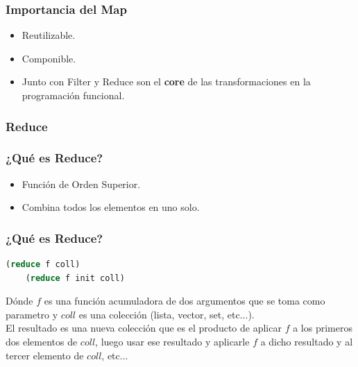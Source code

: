 \documentclass{beamer}
\begin{document}

\begin{frame}[fragile]
    \frametitle{Importancia del Map}
    \begin{itemize}
        \item Reutilizable.
        \item Componible.
        \item Junto con Filter y Reduce son el \textbf{core} de las transformaciones
        en la programación funcional.
    \end{itemize}
\end{frame}

\subsubsection{Reduce}
\begin{frame}[fragile]
    \frametitle{¿Qué es Reduce?}
    \begin{itemize}
        \item Función de Orden Superior.
        \item Combina todos los elementos en uno solo.
    \end{itemize}
\end{frame}


\begin{frame}[fragile]
    \frametitle{¿Qué es Reduce?}
    \begin{center}
    \begin{lstlisting}[language=Clojure]
    (reduce f coll)  
    (reduce f init coll)  
    \end{lstlisting}
    \end{center}
    Dónde $f$ es una función acumuladora de dos argumentos que se toma como parametro y $coll$ es una colección (lista, vector, set, etc...).\\
    El resultado es una nueva colección que es el producto de aplicar $f$ a los primeros dos elementos de $coll$, luego usar ese resultado y aplicarle $f$ a dicho resultado y al tercer elemento de $coll$, etc...
\end{frame}
\end{document}
